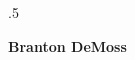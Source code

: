 \documentclass[margin]{res}
\begin{document}

\moveleft.5\hoffset\centerline{\large\bf Branton DeMoss}
\end{document}
